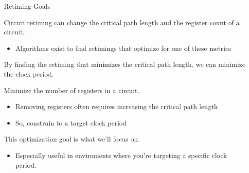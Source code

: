 \begin{frame}{Retiming Goals}

  Circuit retiming can change the critical path length and the register count of a circuit.

  \begin{itemize}
    \item Algorithms exist to find retimings that optimize for one of these metrics~
  \end{itemize}


  By finding the retiming that minimizes the critical path length, we can minimize the clock period.


  Minimize the number of registers in a circuit.

  \begin{itemize}
    \item Removing registers often requires increasing the critical path length
    \item So, constrain to a target clock period
  \end{itemize}

  This optimization goal is what we'll focus on.

  \begin{itemize}
    \item Especially useful in enviroments where you're targeting a specific clock period.
  \end{itemize}

\end{frame}

